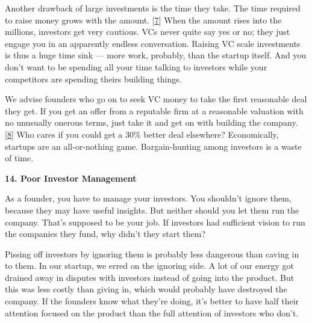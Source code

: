 Another drawback of large
                    investments is the time they take. The time required to
                    raise money grows with the amount.
                    [\href{\#f7n}{7}]
                    When the amount rises into the millions, investors get very
                    cautious. VCs never quite say yes or no; they just engage
                    you in an apparently endless conversation. Raising VC scale
                    investments is thus a huge time sink --- more work,
                    probably, than the startup itself. And you don't want to be
                    spending all your time talking to investors while your
                    competitors are spending theirs building things.

We
                    advise founders who go on to seek VC money to take the first
                    reasonable deal they get. If you get an offer from a
                    reputable firm at a reasonable valuation with no unusually
                    onerous terms, just take it and get on with building the
                    company.
                    [\href{\#f8n}{8}]
                    Who cares if you could get a 30\% better deal elsewhere?
                    Economically, startups are an all-or-nothing game.
                    Bargain-hunting among investors is a waste of time.

\textbf{14. Poor Investor Management}

As a founder, you have to manage your
                    investors. You shouldn't ignore them, because they may have
                    useful insights. But neither should you let them run the
                    company. That's supposed to be your job. If investors had
                    sufficient vision to run the companies they fund, why didn't
                    they start them?

Pissing off investors by
                    ignoring them is probably less dangerous than caving in to
                    them. In our startup, we erred on the ignoring side. A lot
                    of our energy got drained away in disputes with investors
                    instead of going into the product. But this was less costly
                    than giving in, which would probably have destroyed the
                    company. If the founders know what they're doing, it's
                    better to have half their attention focused on the product
                    than the full attention of investors who don't.

